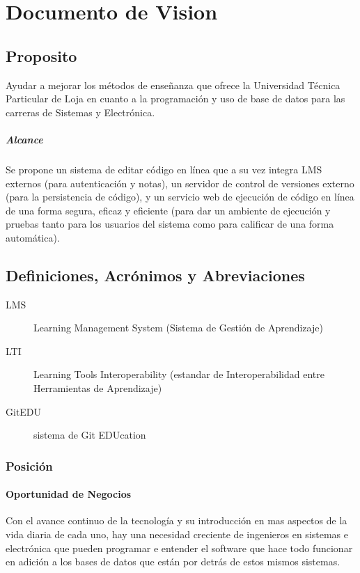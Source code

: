 

\chapter{Documento de Vision}
\label{visionDoc}


\section{Proposito}
Ayudar a mejorar los métodos de enseñanza que ofrece la Universidad Técnica Particular de Loja en cuanto a la programación y uso de base de datos para las carreras de Sistemas y Electrónica.
\paragraph{Alcance}
Se propone un sistema de editar código en línea que a su vez integra LMS externos (para autenticación y notas), un servidor de control de versiones externo (para la persistencia de código), y un servicio web de ejecución de código en línea de una forma segura, eficaz y eficiente (para dar un ambiente de ejecución y pruebas tanto para los usuarios del sistema como para calificar de una forma automática).
\section{Definiciones, Acrónimos y Abreviaciones}
\begin{description}
	\item[LMS] Learning Management System (Sistema de Gestión de Aprendizaje)
    \item[LTI] Learning Tools Interoperability (estandar de Interoperabilidad entre Herramientas de Aprendizaje)
    \item[GitEDU] sistema de Git EDUcation
\end{description}
\subsection{Posición}
\subsubsection{Oportunidad de Negocios}
Con el avance continuo de la tecnología y su introducción en mas aspectos de la vida diaria de cada uno, hay una necesidad creciente de ingenieros en sistemas e electrónica que pueden programar e entender el software que hace todo funcionar en adición a los bases de datos que están por detrás de estos mismos sistemas.
 
